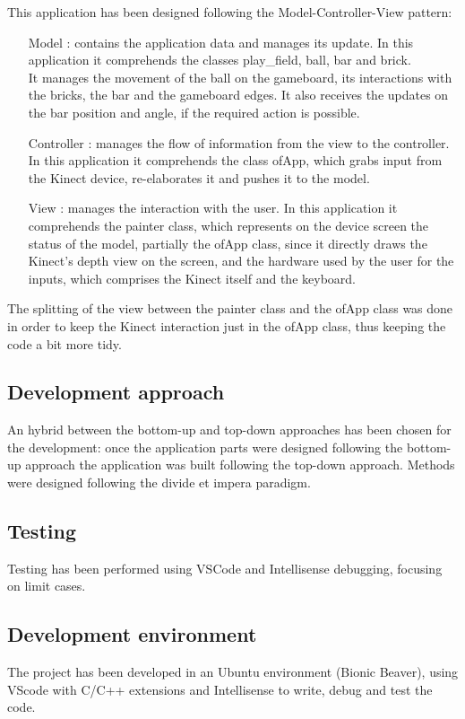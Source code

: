 \documentclass[]{article}
\begin{document}
\newpage
This application has been designed following the Model-Controller-View pattern:
\begin{itemize}
	\item [Model]: contains the application data and manages its update. In this application it comprehends the classes play\_field, ball, bar and brick.\\
				It manages the movement of the ball on the gameboard, its interactions with the bricks, the bar and the gameboard edges. It also receives the updates on the bar position and angle, if the required action is possible. 
	\item [Controller]: manages the flow of information from the view to the controller. In this application it comprehends the class ofApp, which grabs input from the Kinect device, re-elaborates it and pushes it to the model.
	\item [View]: manages the interaction with the user. In this application it comprehends the painter class, which represents on the device screen the status of the model, partially the ofApp class, since it directly draws the Kinect's depth view on the screen, and the hardware used by the user for the inputs, which comprises the Kinect itself and the keyboard. 
\end{itemize}
The splitting of the view between the painter class and the ofApp class was done in order to keep the Kinect interaction just in the ofApp class, thus keeping the code a bit more tidy.
\subsection{Development approach}
An hybrid between the bottom-up and top-down approaches has been chosen for the development: once the application parts were designed following the bottom-up approach the application was built following the top-down approach. Methods were designed following the divide et impera paradigm. 
\subsection{Testing}
Testing has been performed using VSCode and Intellisense debugging, focusing on limit cases. 
\subsection{Development environment}
The project has been developed in an Ubuntu environment (Bionic Beaver), using VScode with C/C++ extensions and Intellisense to write, debug and test the code. 
\end{document}
